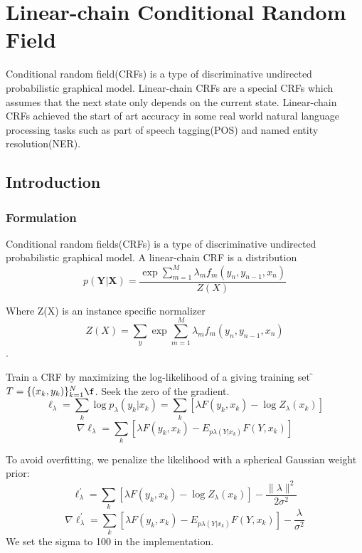 
\chapter[Linear-chain Conditional Random Field]{Linear-chain Conditional Random Field}
Conditional random field(CRFs) is a type of discriminative undirected probabilistic graphical model.
Linear-chain CRFs are a special CRFs which assumes that the next state only depends on the current state. 
Linear-chain CRFs achieved the start of art accuracy in some real world natural language processing tasks such
as part of speech tagging(POS) and named entity resolution(NER).

\section{Introduction}

\subsection{Formulation}
Conditional random fields(CRFs) is a type of discriminative undirected probabilistic graphical model.
A linear-chain CRF is a distribution
    \[p(\boldsymbol Y | \boldsymbol X) = \frac{\exp{\sum_{m=1}^M \lambda_m f_m(y_n,y_{n-1},x_n)}}{Z(X)}\]

Where Z(X) is an instance specific normalizer
\[Z(X) = \sum_{y} \exp{\sum_{m=1}^M \lambda_m f_m(y_n,y_{n-1},x_n)}\].

Train a CRF by maximizing the log-likelihood of a giving training set \f$ T=\{(x_k,y_k)\}_{k=1}^N \f$.
Seek the zero of the gradient.\\
    \[\ell_{\lambda}=\sum_k \log p_\lambda(y_k|x_k) =\sum_k[\lambda F(y_k,x_k)-\log Z_\lambda(x_k)]\]
    \[\nabla \ell_{\lambda}=\sum_k[\lambda F(y_k,x_k)-E_{p\lambda(Y|x_k)}F(Y,x_k)]\]

To avoid overfitting, we penalize the likelihood with a spherical Gaussian weight prior:\\
    \[\ell_{\lambda}^\prime=\sum_k[\lambda F(y_k,x_k)-\log Z_\lambda(x_k)]-\frac{\lVert \lambda \rVert^2}{2\sigma ^2}\]
    \[\nabla \ell_{\lambda}^\prime=\sum_k[\lambda F(y_k,x_k)-E_{p\lambda(Y|x_k)}F(Y,x_k)]-\frac{\lambda}{\sigma ^2}\]
We set the sigma to 100 in the implementation.

